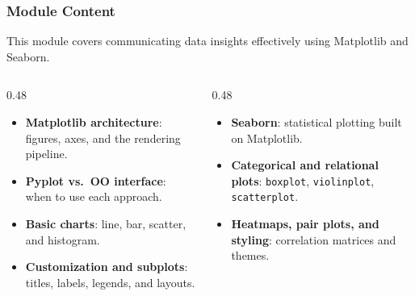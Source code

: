 \documentclass[aspectratio=169,10pt]{beamer}
\newcommand{\keyword}[1]{\textcolor{PrimaryBlue}{\textbf{#1}}}
\newcommand{\codeword}[1]{\texttt{#1}}
\begin{document}
\begin{frame}
\frametitle{Module Content}
\small
This module covers communicating data insights effectively using Matplotlib and Seaborn.

\vspace{0.16cm}
\begin{columns}[T,totalwidth=0.96\textwidth]
\begin{column}{0.48\textwidth}
\begin{itemize}\setlength\itemsep{0.08cm}
  \item \keyword{Matplotlib architecture}: figures, axes, and the rendering pipeline.
  \item \keyword{Pyplot vs.\ OO interface}: when to use each approach.
  \item \keyword{Basic charts}: line, bar, scatter, and histogram.
  \item \keyword{Customization and subplots}: titles, labels, legends, and layouts.
\end{itemize}
\end{column}
\begin{column}{0.48\textwidth}
\begin{itemize}\setlength\itemsep{0.08cm}
  \item \keyword{Seaborn}: statistical plotting built on Matplotlib.
  \item \keyword{Categorical and relational plots}: \codeword{boxplot}, \codeword{violinplot}, \codeword{scatterplot}.
  \item \keyword{Heatmaps, pair plots, and styling}: correlation matrices and themes.
\end{itemize}
\end{column}
\end{columns}
\end{frame}
\end{document}
